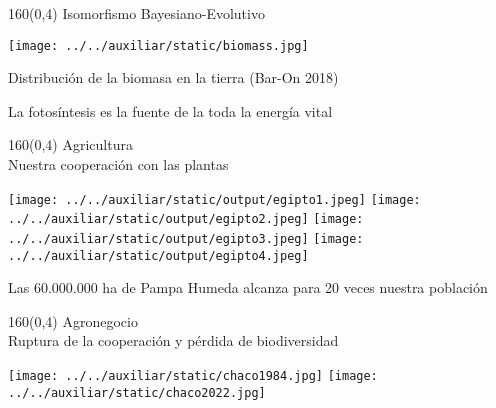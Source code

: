 \documentclass[shownotes,aspectratio=169]{beamer}
\begin{document}
\begin{frame}[plain]
\begin{textblock}{160}(0,4)
\centering \LARGE Isomorfismo Bayesiano-Evolutivo
\end{textblock}
\vspace{2cm}

\centering
  \texttt{[image: ../../auxiliar/static/biomass.jpg]} 
  
  \vspace{0.2cm}
  
  \footnotesize Distribución de la biomasa en la tierra (Bar-On 2018)
  
  \pause

  \vspace{0.7cm}
  
  \large 
  La fotosíntesis es la fuente de la toda la energía vital
  
\end{frame}


\begin{frame}[plain]
\begin{textblock}{160}(0,4)
\centering \LARGE Agricultura \\
\Large Nuestra cooperación con las plantas
\end{textblock}
\centering


\vspace{1.8cm}

\texttt{[image: ../../auxiliar/static/output/egipto1.jpeg]} 
\texttt{[image: ../../auxiliar/static/output/egipto2.jpeg]} 
\texttt{[image: ../../auxiliar/static/output/egipto3.jpeg]} 
\texttt{[image: ../../auxiliar/static/output/egipto4.jpeg]} 
    
\pause

\vspace{0.4cm}

Las 60.000.000 ha de Pampa Humeda alcanza para 20 veces nuestra población

\end{frame}

\begin{frame}[plain]
\begin{textblock}{160}(0,4)
\centering \LARGE Agronegocio \\
\Large Ruptura de la cooperación y pérdida de biodiversidad
\end{textblock}
\centering \vspace{1.5cm}

\texttt{[image: ../../auxiliar/static/chaco1984.jpg]} 
\texttt{[image: ../../auxiliar/static/chaco2022.jpg]} 
\end{frame}
\end{document}
